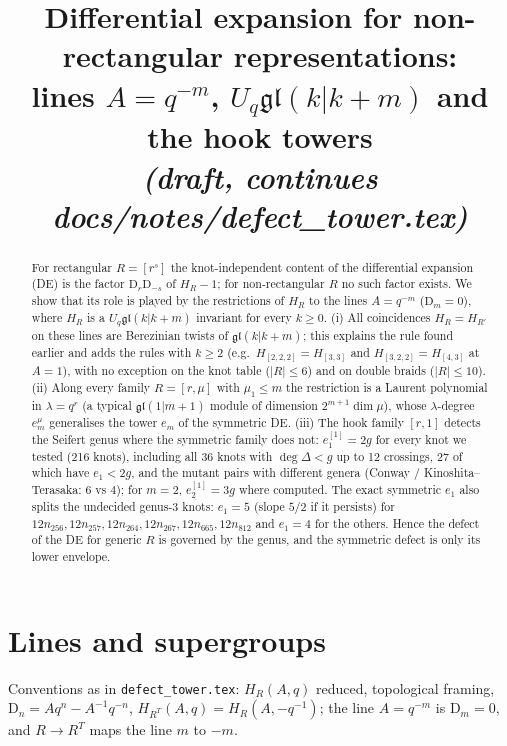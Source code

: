 \documentclass[11pt]{article}
\title{Differential expansion for non-rectangular representations:\\
lines $A=q^{-m}$, $U_q\mathfrak{gl}(k|k+m)$ and the hook towers\\[2mm]\large\emph{(draft, continues docs/notes/defect\_tower.tex)}}
\author{}
\date{}
\theoremstyle{remark}
\newcommand{\D}{\mathrm{D}}
\begin{document}
\maketitle

\begin{abstract}
For rectangular $R=[r^s]$ the knot-independent content of the differential expansion (DE) is the
factor $\D_r\D_{-s}$ of $H_R-1$; for non-rectangular $R$ no such factor exists.  We show that its role is
played by the restrictions of $H_R$ to the lines $A=q^{-m}$ ($\D_m=0$), where $H_R$ is a
$U_q\mathfrak{gl}(k|k+m)$ invariant for every $k\ge0$.  (i) All coincidences $H_R=H_{R'}$ on these lines are
Berezinian twists of $\mathfrak{gl}(k|k+m)$; this explains the rule found earlier and adds the rules with $k\ge2$
(e.g.\ $H_{[2,2,2]}=H_{[3,3]}$ and $H_{[3,2,2]}=H_{[4,3]}$ at $A=1$), with no exception on the knot table ($|R|\le6$) and on double braids
($|R|\le10$).  (ii) Along every family $R=[r,\mu]$ with $\mu_1\le m$ the restriction is a Laurent polynomial in
$\lambda=q^r$ (a typical $\mathfrak{gl}(1|m+1)$ module of dimension $2^{m+1}\dim\mu$), whose $\lambda$-degree
$e^\mu_m$ generalises the tower $e_m$ of the symmetric DE.  (iii) The hook family $[r,1]$ detects the Seifert genus where the
symmetric family does not: $e^{[1]}_1=2g$ for every knot we tested (216 knots), including all 36 knots with
$\deg\Delta<g$ up to 12 crossings, 27 of which have $e_1<2g$, and the mutant pairs with different genera
(Conway / Kinoshita--Terasaka: $6$ vs $4$); for $m=2$, $e^{[1]}_2=3g$ where computed.  The exact symmetric $e_1$
also splits the undecided genus-3 knots: $e_1=5$ (slope $5/2$ if it persists) for $12n_{256},12n_{257},12n_{264},
12n_{267},12n_{665},12n_{812}$ and $e_1=4$ for the others.  Hence the defect of the DE for generic $R$ is governed by the
genus, and the symmetric defect is only its lower envelope.
\end{abstract}

\section{Lines and supergroups}

Conventions as in \texttt{defect\_tower.tex}: $H_R(A,q)$ reduced, topological framing, $\D_n=Aq^n-A^{-1}q^{-n}$,
$H_{R^T}(A,q)=H_R(A,-q^{-1})$; the line $A=q^{-m}$ is $\D_m=0$, and $R\to R^T$ maps the line $m$ to $-m$.
\end{document}
